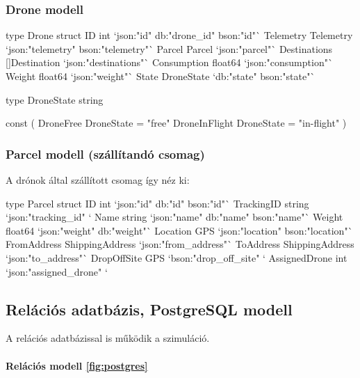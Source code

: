 \subsubsection{Drone modell}
\begin{python}
    type Drone struct {
        ID           int           `json:"id" db:"drone_id" bson:"id"`
        Telemetry    Telemetry     `json:"telemetry" bson:"telemetry"`
        Parcel       Parcel        `json:"parcel"`
        Destinations []Destination `json:"destinations"`
        Consumption  float64       `json:"consumption"`
        Weight       float64       `json:"weight"`
        State        DroneState    `db:"state" bson:"state"`
    }

    type DroneState string

    const (
    DroneFree     DroneState = "free"
    DroneInFlight DroneState = "in-flight"
    )
\end{python}


\subsubsection{Parcel modell (szállítandó csomag)}
A drónok által szállított csomag így néz ki:
\begin{python}
    type Parcel struct {
        ID            int             `json:"id" db:"id" bson:"id"`
        TrackingID    string          `json:"tracking_id" `
        Name          string          `json:"name" db:"name" bson:"name"`
        Weight        float64         `json:"weight" db:"weight"`
        Location      GPS             `json:"location" bson:"location"`
        FromAddress   ShippingAddress `json:"from_address"`
        ToAddress     ShippingAddress `json:"to_address"`
        DropOffSite   GPS             `bson:"drop_off_site" `
        AssignedDrone int             `json:"assigned_drone" `
    }
\end{python}

\subsection{Relációs adatbázis, PostgreSQL modell}
A relációs adatbázissal is működik a szimuláció.
\paragraph{Relációs modell \ref{fig:postgres} } \mbox{} \\

